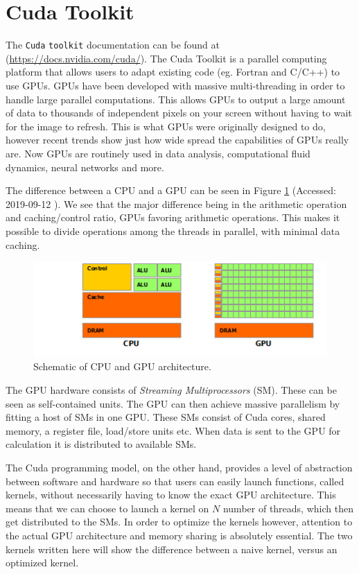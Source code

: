 \documentclass{article}
\begin{document}
\section{Cuda Toolkit}
The \verb+Cuda+ \verb+toolkit+ documentation can be found at (\url{https://docs.nvidia.com/cuda/}). The Cuda Toolkit is a parallel computing platform that allows users to adapt existing code (eg. Fortran and C/C++) to use GPUs. GPUs have been developed with massive multi-threading in order to handle large parallel computations. This allows GPUs to output a large amount of data to thousands of independent pixels on your screen without having to wait for the image to refresh. This is what GPUs were originally designed to do, however recent trends show just how wide spread the capabilities of GPUs really are. Now GPUs are routinely used in data analysis, computational fluid dynamics, neural networks and more.

The difference between a CPU and a GPU can be seen in Figure \ref{CPUvGPU}  (Accessed: 2019-09-12  \cite{CudaToolkit}). We see that the major difference being in the arithmetic operation and caching/control ratio, GPUs favoring arithmetic operations. This makes it possible to divide operations among the threads in parallel, with minimal data caching.
\begin{figure}[H]
\centering
  \includegraphics[width=\textwidth]{gpu-devotes-more-transistors-to-data-processing.png}
  \caption{Schematic of CPU and GPU architecture.}
  \label{CPUvGPU}
\end{figure}
The GPU hardware consists of \textit{Streaming Multiprocessors} (SM). These can be seen as self-contained units. The GPU can then achieve massive parallelism by fitting a host of SMs in one GPU. These SMs consist of Cuda cores, shared memory, a register file, load/store units etc. When data is sent to the GPU for calculation it is distributed to available SMs.

The Cuda programming model, on the other hand, provides a level of abstraction between software and hardware so that users can easily launch functions, called kernels, without necessarily having to know the exact GPU architecture. This means that we can choose to launch a kernel on $N$ number of threads, which then get distributed to the SMs. In order to optimize the kernels however, attention to the actual GPU architecture and memory sharing is absolutely essential. The two kernels written here will show the difference between a naive kernel, versus an optimized kernel. 
\end{document}
